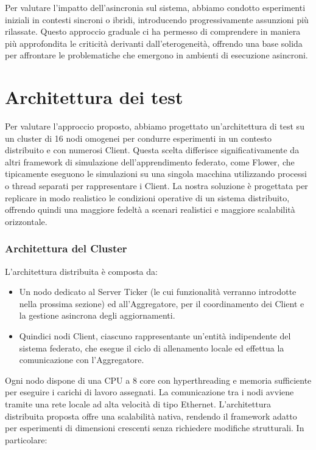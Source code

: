 \documentclass[a4paper, oneside, openright]{report}
\let\oldsection\section
\renewcommand{\section}{\newpage\oldsection}
\begin{document}
Per valutare l'impatto dell'asincronia sul sistema, abbiamo condotto esperimenti iniziali in contesti sincroni o ibridi, introducendo progressivamente assunzioni più rilassate. Questo approccio graduale ci ha permesso di comprendere in maniera più approfondita le criticità derivanti dall'eterogeneità, offrendo una base solida per affrontare le problematiche che emergono in ambienti di esecuzione asincroni. 

\section{Architettura dei test}
Per valutare l’approccio proposto, abbiamo progettato un’architettura di test su un cluster di 16 nodi omogenei per condurre esperimenti in un contesto distribuito e con numerosi Client. Questa scelta differisce significativamente da altri framework di simulazione dell’apprendimento federato, come Flower, che tipicamente eseguono le simulazioni su una singola macchina utilizzando processi o thread separati per rappresentare i Client. La nostra soluzione è progettata per replicare in modo realistico le condizioni operative di un sistema distribuito, offrendo quindi una maggiore fedeltà a scenari realistici e maggiore scalabilità orizzontale.

\subsubsection*{Architettura del Cluster} 
L’architettura distribuita è composta da:
\begin{itemize}
    \item Un nodo dedicato al Server Ticker (le cui funzionalità verranno introdotte nella prossima sezione) ed all’Aggregatore, per il coordinamento dei Client e la gestione asincrona degli aggiornamenti.

    \item Quindici nodi Client, ciascuno rappresentante un’entità indipendente del sistema federato, che esegue il ciclo di allenamento locale ed effettua la comunicazione con l’Aggregatore.
\end{itemize}

Ogni nodo dispone di una CPU a 8 core con hyperthreading e memoria sufficiente per eseguire i carichi di lavoro assegnati. La comunicazione tra i nodi avviene tramite una rete locale ad alta velocità di tipo Ethernet. L’architettura distribuita proposta offre una scalabilità nativa, rendendo il framework adatto per esperimenti di dimensioni crescenti senza richiedere modifiche strutturali. In particolare:
\end{document}
